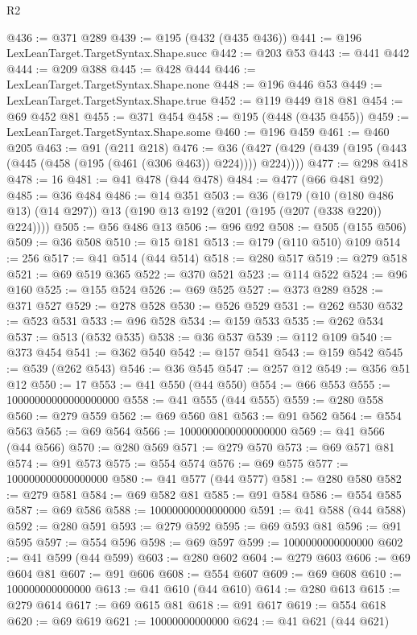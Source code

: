 \begin{lexlean}{R2}
\begin{coremodule}
{{{{{{{{{{{{{{{{{{{{{{{{{{{{{{{{{{{{{{{{{{{{{{@436 := @371 @289
@439 := @195 (@432 (@435 @436))
@441 := @196 LexLeanTarget.TargetSyntax.Shape.succ
@442 := @203 @53
@443 := @441 @442
@444 := @209 @388
@445 := @428 @444
@446 := LexLeanTarget.TargetSyntax.Shape.none
@448 := @196 @446 @53
@449 := LexLeanTarget.TargetSyntax.Shape.true
@452 := @119 @449 @18 @81
@454 := @69 @452 @81
@455 := @371 @454
@458 := @195 (@448 (@435 @455))
@459 := LexLeanTarget.TargetSyntax.Shape.some
@460 := @196 @459
@461 := @460 @205
@463 := @91 (@211 @218)
@476 := @36 (@427 (@429 (@439 (@195 (@443 (@445 (@458 (@195 (@461 (@306 @463)) @224)))) @224))))
@477 := @298 @418
@478 := 16
@481 := @41 @478 (@44 @478)
@484 := @477 (@66 @481 @92)
@485 := @36 @484
@486 := @14 @351
@503 := @36
    (@179
      (@10 (@180 @486 @13) (@14 @297))
      @13
      (@190 @13 @192 (@201 (@195 (@207 (@338 @220)) @224))))
@505 := @56 @486 @13
@506 := @96 @92
@508 := @505 (@155 @506)
@509 := @36 @508
@510 := @15 @181
@513 := @179 (@110 @510) @109
@514 := 256
@517 := @41 @514 (@44 @514)
@518 := @280 @517
@519 := @279 @518
@521 := @69 @519 @365
@522 := @370 @521
@523 := @114 @522
@524 := @96 @160
@525 := @155 @524
@526 := @69 @525
@527 := @373 @289
@528 := @371 @527
@529 := @278 @528
@530 := @526 @529
@531 := @262 @530
@532 := @523 @531
@533 := @96 @528
@534 := @159 @533
@535 := @262 @534
@537 := @513 (@532 @535)
@538 := @36 @537
@539 := @112 @109
@540 := @373 @454
@541 := @362 @540
@542 := @157 @541
@543 := @159 @542
@545 := @539 (@262 @543)
@546 := @36 @545
@547 := @257 @12
@549 := @356 @51 @12
@550 := 17
@553 := @41 @550 (@44 @550)
@554 := @66 @553
@555 := 10000000000000000000
@558 := @41 @555 (@44 @555)
@559 := @280 @558
@560 := @279 @559
@562 := @69 @560 @81
@563 := @91 @562
@564 := @554 @563
@565 := @69 @564
@566 := 1000000000000000000
@569 := @41 @566 (@44 @566)
@570 := @280 @569
@571 := @279 @570
@573 := @69 @571 @81
@574 := @91 @573
@575 := @554 @574
@576 := @69 @575
@577 := 100000000000000000
@580 := @41 @577 (@44 @577)
@581 := @280 @580
@582 := @279 @581
@584 := @69 @582 @81
@585 := @91 @584
@586 := @554 @585
@587 := @69 @586
@588 := 10000000000000000
@591 := @41 @588 (@44 @588)
@592 := @280 @591
@593 := @279 @592
@595 := @69 @593 @81
@596 := @91 @595
@597 := @554 @596
@598 := @69 @597
@599 := 1000000000000000
@602 := @41 @599 (@44 @599)
@603 := @280 @602
@604 := @279 @603
@606 := @69 @604 @81
@607 := @91 @606
@608 := @554 @607
@609 := @69 @608
@610 := 100000000000000
@613 := @41 @610 (@44 @610)
@614 := @280 @613
@615 := @279 @614
@617 := @69 @615 @81
@618 := @91 @617
@619 := @554 @618
@620 := @69 @619
@621 := 10000000000000
@624 := @41 @621 (@44 @621)
}}}}}}}}}}}}}}}}}}}}}}}}}}}}}}}}}}}}}}}}}}}}}}
\end{coremodule}
\end{lexlean}
